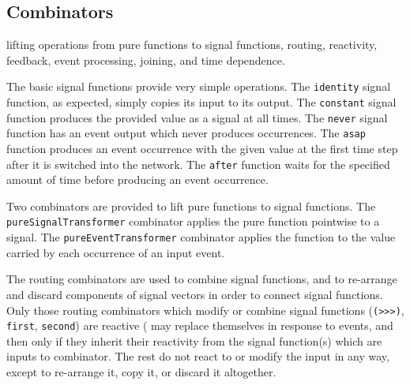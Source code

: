 
\subsection{Combinators}
\label{section:System_Design_and_Interface-Combinators}

lifting operations from pure functions to signal functions,
routing, reactivity, feedback, event processing, joining, and time dependence.
%

The basic signal functions
provide very simple operations. The {\tt identity} signal function, as expected,
simply copies its input to its output. The {\tt constant} signal function
produces the provided value as a signal at all times. The {\tt never} signal
function has an event output which never produces occurrences. The {\tt asap}
function produces an event occurrence with the given value at the first time
step after it is switched into the network. The {\tt after} function waits for
the specified amount of time before producing an event occurrence.

Two combinators are provided to lift pure functions to signal functions.
The {\tt pureSignalTransformer} combinator applies the pure function pointwise
to a signal. The {\tt pureEventTransformer} combinator applies the function to
the value carried by each occurrence of an input event.

The routing combinators are used to combine signal functions, and to re-arrange
and discard components of signal vectors in order to connect signal functions.
%
Only those routing combinators which modify or combine signal functions
({\tt (>>>)}, {\tt first}, {\tt second}) are reactive (\ie{} may replace themselves in
response to events, and then only if they inherit their reactivity from the
signal function(s) which are inputs to combinator. The rest do not
react to or modify the input in any way, except to re-arrange it, copy it, or
discard it altogether.

